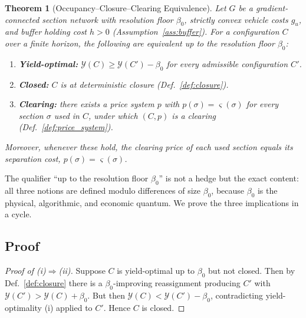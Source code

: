 \documentclass[11pt,twocolumn,a4paper]{article}
\newtheorem{theorem}{Theorem}[section]
\theoremstyle{definition}
\theoremstyle{remark}
\newcommand{\yield}{\mathcal{Y}}
\newcommand{\blocktime}{\beta_0}
\newcommand{\sep}{\varsigma}
\begin{document}
\begin{theorem}[Occupancy--Closure--Clearing Equivalence]
\label{thm:trinity}
Let $G$ be a gradient-connected section network with resolution floor $\blocktime$, strictly convex vehicle costs $g_u$, and buffer holding cost $h>0$ (Assumption~\ref{ass:buffer}). For a configuration $C$ over a finite horizon, the following are equivalent up to the resolution floor $\blocktime$:
\begin{enumerate}[label=\textup{(\roman*)},nosep]
\item \textbf{Yield-optimal:} $\yield(C) \ge \yield(C') - \blocktime$ for every admissible configuration $C'$.
\item \textbf{Closed:} $C$ is at deterministic closure (Def.~\ref{def:closure}).
\item \textbf{Clearing:} there exists a price system $p$ with $p(\sigma)=\sep(\sigma)$ for every section $\sigma$ used in $C$, under which $(C,p)$ is a clearing (Def.~\ref{def:price_system}).
\end{enumerate}
Moreover, whenever these hold, the clearing price of each used section equals its separation cost, $p(\sigma) = \sep(\sigma)$.
\end{theorem}

The qualifier ``up to the resolution floor $\blocktime$'' is not a hedge but the exact content: all three notions are defined modulo differences of size $\blocktime$, because $\blocktime$ is the physical, algorithmic, and economic quantum. We prove the three implications in a cycle.

\subsection{Proof}

\begin{proof}[Proof of \textup{(i)}$\Rightarrow$\textup{(ii)}]
Suppose $C$ is yield-optimal up to $\blocktime$ but not closed. Then by Def.~\ref{def:closure} there is a $\blocktime$-improving reassignment producing $C'$ with $\yield(C') > \yield(C) + \blocktime$. But then $\yield(C) < \yield(C') - \blocktime$, contradicting yield-optimality (i) applied to $C'$. Hence $C$ is closed.
\end{proof}
\end{document}
